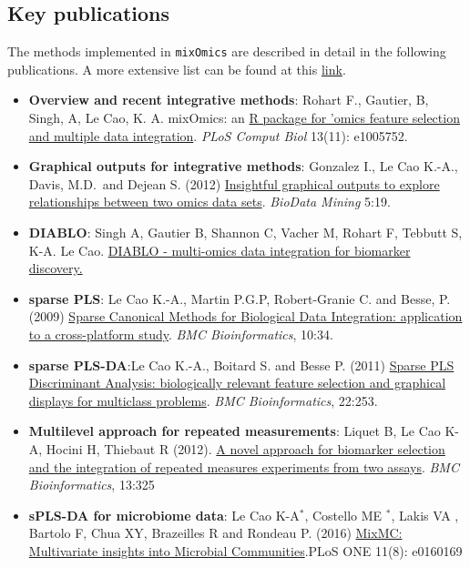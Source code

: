 \documentclass[]{book}
\theoremstyle{definition}
\theoremstyle{definition}
\theoremstyle{definition}
\theoremstyle{remark}
\begin{document}
\subsection{Key publications}\label{intro:pubs}

The methods implemented in \texttt{mixOmics} are described in detail in
the following publications. A more extensive list can be found at this
\href{http://mixomics.org/a-propos/publications/}{link}.

\begin{itemize}
\item
  \textbf{Overview and recent integrative methods}: Rohart F., Gautier,
  B, Singh, A, Le Cao, K. A. mixOmics: an
  \href{http://journals.plos.org/ploscompbiol/article?id=10.1371/journal.pcbi.1005752}{R
  package for 'omics feature selection and multiple data integration}.
  \emph{PLoS Comput Biol} 13(11): e1005752.
\item
  \textbf{Graphical outputs for integrative methods}: \citep{Gon12}
  Gonzalez I., Le Cao K.-A., Davis, M.D.~and Dejean S. (2012)
  \href{https://biodatamining.biomedcentral.com/articles/10.1186/1756-0381-5-19}{Insightful
  graphical outputs to explore relationships between two omics data
  sets}. \emph{BioData Mining} 5:19.
\item
  \textbf{DIABLO}: Singh A, Gautier B, Shannon C, Vacher M, Rohart F,
  Tebbutt S, K-A. Le Cao.
  \href{https://www.biorxiv.org/content/early/2018/03/20/067611}{DIABLO
  - multi-omics data integration for biomarker discovery.}
\item
  \textbf{sparse PLS}: Le Cao K.-A., Martin P.G.P, Robert-Granie C. and
  Besse, P. (2009)
  \href{http://www.biomedcentral.com/1471-2105/10/34/}{Sparse Canonical
  Methods for Biological Data Integration: application to a
  cross-platform study}. \emph{BMC Bioinformatics}, 10:34.
\item
  \textbf{sparse PLS-DA}:Le Cao K.-A., Boitard S. and Besse P. (2011)
  \href{https://bmcbioinformatics.biomedcentral.com/articles/10.1186/1471-2105-12-253}{Sparse
  PLS Discriminant Analysis: biologically relevant feature selection and
  graphical displays for multiclass problems}. \emph{BMC
  Bioinformatics}, 22:253.
\item
  \textbf{Multilevel approach for repeated measurements}: Liquet B, Le
  Cao K-A, Hocini H, Thiebaut R (2012).
  \href{https://bmcbioinformatics.biomedcentral.com/articles/10.1186/1471-2105-13-325}{A
  novel approach for biomarker selection and the integration of repeated
  measures experiments from two assays}. \emph{BMC Bioinformatics},
  13:325
\item
  \textbf{sPLS-DA for microbiome data}: Le Cao K-A\(^*\), Costello ME
  \(^*\), Lakis VA , Bartolo F, Chua XY, Brazeilles R and Rondeau P.
  (2016)
  \href{http://journals.plos.org/plosone/article?id=10.1371/journal.pone.0160169}{MixMC:
  Multivariate insights into Microbial Communities}.PLoS ONE 11(8):
  e0160169
\end{itemize}
\end{document}
